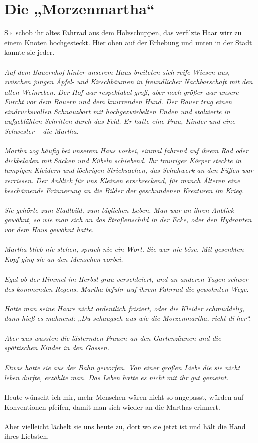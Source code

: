 \chapter{Die „Morzenmartha“}
\lettrine{S}{ie} schob ihr altes Fahrrad aus dem Holzschuppen, das verfilzte Haar wirr zu einem Knoten hochgesteckt. Hier oben auf der Erhebung und unten in der Stadt kannte sie jeder. \\\\
\textit{Auf dem Bauernhof hinter unserem Haus breiteten sich reife Wiesen aus, zwischen jungen Äpfel- und Kirschbäumen in freundlicher Nachbarschaft mit den alten Weinreben. Der Hof war respektabel groß, aber noch größer war unsere Furcht vor dem Bauern und dem knurrenden Hund. Der Bauer trug einen eindrucksvollen Schnauzbart mit hochgezwirbelten Enden und stolzierte in aufgeblähten Schritten durch das Feld. Er hatte eine Frau, Kinder und eine Schwester – die Martha. \\\\
Martha zog häufig bei unserem Haus vorbei, einmal fahrend auf ihrem Rad oder dickbeladen mit Säcken und Kübeln schiebend. Ihr trauriger Körper steckte in lumpigen Kleidern und löchrigen Stricksachen, das Schuhwerk an den Füßen war zerrissen. Der Anblick für uns Kleinen erschreckend, für manch Älteren eine beschämende Erinnerung an die Bilder der geschundenen Kreaturen im Krieg. \\\\
Sie gehörte zum Stadtbild, zum täglichen Leben. Man war an ihren Anblick gewöhnt, so wie man sich an das Straßenschild in der Ecke, oder den Hydranten vor dem Haus gewöhnt hatte. \\\\
Martha blieb nie stehen, sprach nie ein Wort. Sie war nie böse. Mit gesenkten Kopf ging sie an den Menschen vorbei. \\\\
Egal ob der Himmel im Herbst grau verschleiert, und an anderen Tagen schwer des kommenden Regens, Martha befuhr auf ihrem Fahrrad die gewohnten Wege. \\\\
Hatte man seine Haare nicht ordentlich frisiert, oder die Kleider schmuddelig, dann hieß es mahnend: „Du schaugsch aus wie die Morzenmartha, richt di her“.\\\\
Aber was wussten die lästernden Frauen an den Gartenzäunen und die spöttischen Kinder in den Gassen.\\\\
Etwas hatte sie aus der Bahn geworfen. Von einer großen Liebe die sie nicht leben durfte, erzählte man. Das Leben hatte es nicht mit ihr gut gemeint.}\\\\

Heute wünscht ich mir, mehr Menschen wären nicht so angepasst, würden auf Konventionen pfeifen, damit man sich wieder an die Marthas erinnert. \\\\
Aber vielleicht lächelt sie uns heute zu, dort wo sie jetzt ist und hält die Hand ihres Liebsten.